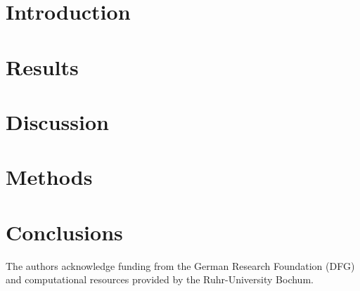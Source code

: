 \documentclass[prb,twocolumn,aps,showpacs,superscriptaddress]{revtex4-2}
\begin{document}
\maketitle

\section{Introduction}


\section{Results}


\section{Discussion}


\section{Methods}


\section{Conclusions}


\begin{acknowledgments}
The authors acknowledge funding from the German Research Foundation (DFG) and computational resources provided by the Ruhr-University Bochum.
\end{acknowledgments}



\end{document}

